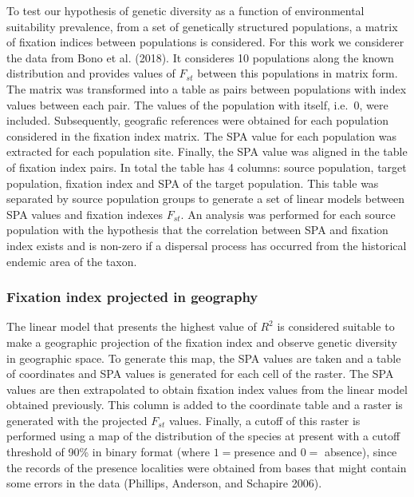 \documentclass[
]{article}
\begin{document}
To test our hypothesis of genetic diversity as a function of
environmental suitability prevalence, from a set of genetically
structured populations, a matrix of fixation indices between populations
is considered. For this work we considerer the data from Bono et al.
(2018). It consideres 10 populations along the known distribution and
provides values of \(F_{st}\) between this populations in matrix form. The
matrix was transformed into a table as pairs between populations with
index values between each pair. The values of the population with
itself, i.e.~\(0\), were included. Subsequently, geografic references were
obtained for each population considered in the fixation index matrix.
The SPA value for each population was
extracted for each population site. Finally, the SPA value was aligned in the table of fixation
index pairs. In total the table has 4 columns: source population, target
population, fixation index and SPA of the target population. This table
was separated by source population groups to generate a set of linear
models between SPA values and fixation indexes \(F_{st}\). An analysis
was performed for each source population with the hypothesis that the
correlation between SPA and fixation index exists and is non-zero if a
dispersal process has occurred from the historical endemic area of the
taxon.

\hypertarget{fixation-index-projected-in-geography}{%
\subsubsection{Fixation index projected in
geography}\label{fixation-index-projected-in-geography}}

The linear model that presents the highest value of \(R^2\) is
considered suitable to make a geographic projection of the fixation
index and observe genetic diversity in geographic space. To generate
this map, the SPA values are taken and a table of coordinates and SPA
values is generated for each cell of the raster. The SPA values are then
extrapolated to obtain fixation index values from the linear model
obtained previously. This column is added to the coordinate table and a
raster is generated with the projected \(F_{st}\) values. Finally, a
cutoff of this raster is performed using a map of the distribution of
the species at present with a cutoff threshold of 90\% in binary format
(where \(1 =\)presence and \(0 =\) absence), since the records of the
presence localities were obtained from bases that might contain some
errors in the data (Phillips, Anderson, and Schapire 2006).
\end{document}
